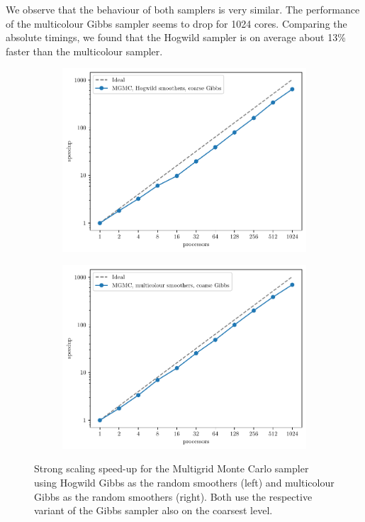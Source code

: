 \documentclass[
fontsize=11pt,
paper=a4,
numbers=noenddot
]{scrartcl}
\begin{document}
We observe that the behaviour of both samplers is very similar. The performance of the multicolour Gibbs sampler seems to drop for 1024 cores. Comparing the absolute timings, we found that the Hogwild sampler is on average about 13\% faster than the multicolour sampler.

\begin{figure}[htbp]
    \centering
    \begin{subfigure}[b]{0.49\textwidth}
        \centering
        \includegraphics[width=\textwidth]{plots/strong_scaling_mgmc+hw+gibbs_4097x4097.pdf}
    \end{subfigure}
    \hfill
    \begin{subfigure}[b]{0.49\textwidth}
        \centering
        \includegraphics[width=\textwidth]{plots/strong_scaling_mgmc+mg+gibbs_4097x4097.pdf}
    \end{subfigure}
    \caption{Strong scaling speed-up for the Multigrid Monte Carlo sampler using Hogwild Gibbs as the random smoothers (left) and multicolour Gibbs as the random smoothers (right). Both use the respective variant of the Gibbs sampler also on the coarsest level.}
    \label{fig:2d_structured_mgmc_ss}
\end{figure}
\end{document}
